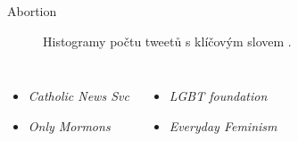 \documentclass[notheorems,12pt]{beamer}
\begin{document}
\begin{frame}{Abortion}
    \begin{figure}
        \centering
        \vspace{-0.7cm}
        \caption*{Histogramy počtu tweetů s klíčovým slovem \textit{}.}
    \end{figure}
    \begin{columns}
    \column{6cm}
    	\begin{itemize}
    		\item \textit{Catholic News Svc}
    		\item \textit{Only Mormons}
    	\end{itemize}
    \column{6cm}
    	\begin{itemize}
    		\item \textit{LGBT foundation}
    		\item \textit{Everyday Feminism}
    	\end{itemize}
    \end{columns}
\end{frame}
\end{document}
